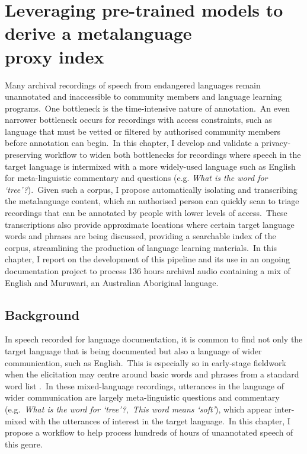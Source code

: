 \documentclass[main.tex]{subfiles}
\begin{document}
\vspace{2em}

\chapter[Leveraging pre-trained models to derive a metalanguage proxy index]{Leveraging pre-trained models to derive a metalanguage\\proxy index}

\vspace{2em}

Many archival recordings of speech from endangered languages remain unannotated and inaccessible to community members and language learning programs.~One bottleneck is the time-intensive nature of annotation.~An even narrower bottleneck occurs for recordings with access constraints, such as language that must be vetted or filtered by authorised community members before annotation can begin.~In this chapter, I develop and validate a privacy-preserving workflow to widen both bottlenecks for recordings where speech in the target language is intermixed with a more widely-used language such as English for meta-linguistic commentary and questions (e.g. \textit{What is the word for `tree'?}).~Given such a corpus, I propose automatically isolating and transcribing the metalanguage content, which an authorised person can quickly scan to triage recordings that can be annotated by people with lower levels of access.~These transcriptions also provide approximate locations where certain target language words and phrases are being discussed, providing a searchable index of the corpus, streamlining the production of language learning materials.~In this chapter, I report on the development of this pipeline and its use in an ongoing documentation project to process 136 hours archival audio containing a mix of English and Muruwari, an Australian Aboriginal language.

\section{Background}

In speech recorded for language documentation, it is common to find not only the target language that is being documented but also a language of wider communication, such as English.~This is especially so in early-stage fieldwork when the elicitation may centre around basic words and phrases from a standard word list \textcite[e.g.~the Swadesh List:][]{swadesh1955towards}.~In these mixed-language recordings, utterances in the language of wider communication are largely meta-linguistic questions and commentary (e.g.~\emph{What is the word for `tree'?},~\emph{This word means `soft'}), which appear inter-mixed with the utterances of interest in the target language.~In this chapter, I propose a workflow to help process hundreds of hours of unannotated speech of this genre.
\end{document}
